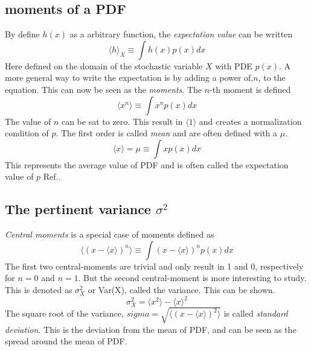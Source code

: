 \documentclass[%
twoside,                 %
final,                   %
chapterprefix=true,      %
open=right               %
10pt]{book}
\begin{document}
\subsection{moments of a PDF}
By define $h(x)$ as a arbitrary function, the \emph{expectation value} can be written
\begin{equation}
    \langle h \rangle_X \equiv \int h(x)p(x)dx
\end{equation}
Here defined on the domain of the stochastic variable $X$ with PDE $p(x)$. A more general way to write the expectation is by adding a power of,$n$, to the equation. This can now be seen as the \emph{moments}. The $n$-th moment is defined
\begin{equation}
    \langle x^n \rangle \equiv \int x^np(x)dx
\end{equation}
The value of $n$ can be sat to zero. This result in $\langle 1 \rangle$ and creates a normalization condition of $p$. The first order is called \emph{mean} and are often defined with a $\mu$.
\begin{equation}
    \langle x \rangle = \mu \equiv \int xp(x)dx
\end{equation}
This represents the average value of PDF and is often called the expectation value of $p$ Ref.\cite{hjorth2011computational}.

\subsection{The pertinent variance $\sigma ^2$}
\emph{Central moments} is a special case of moments defined as
\begin{equation}
    \langle (x-\langle x \rangle)^n \rangle \equiv \int (x-\langle x \rangle)^np(x)dx
\end{equation}
The first two central-moments are trivial and only result in 1 and 0, respectively for $n=0$ and $n=1$. But the second central-moment is more interesting to study. This is denoted as $\sigma^2_X$ or Var(X), called the variance. This can be shown.
\begin{equation}
    \sigma^2_X  = \langle x^2\rangle -\langle x \rangle^2 
\end{equation}
The square root of the variance, $sigma = \sqrt{\langle (x-\langle x \rangle)^2 \rangle}$ is called \emph{standard deviation}. This is the deviation from the mean of PDF, and can be seen as the spread around the mean of PDF.
\end{document}
